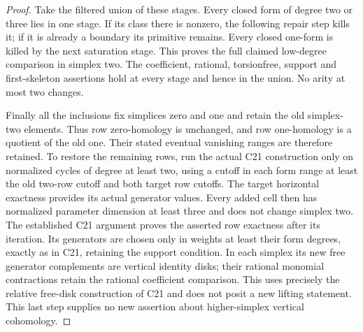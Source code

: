 \begin{proof}
Take the filtered union of these stages.
Every closed form of degree two or three lies
in one stage. If its class there is nonzero,
the following repair step kills it; if it is
already a boundary its primitive remains.
Every closed one-form is killed by the next
saturation stage. This proves the full claimed
low-degree comparison in simplex two.
The coefficient, rational, torsionfree, support
and first-skeleton assertions hold at every
stage and hence in the union.
No arity at most two changes.

Finally all the inclusions fix simplices zero
and one and retain the old simplex-two elements.
Thus row zero-homology is unchanged, and row
one-homology is a quotient of the old one.
Their stated eventual vanishing ranges are
therefore retained. To restore the remaining
rows, run the actual C21 construction only on
normalized cycles of degree at least two,
using a cutoff in each form range at least
the old two-row cutoff and both target row
cutoffs. The target horizontal exactness
provides its actual generator values.
Every added cell then has normalized parameter
dimension at least three and does not change
simplex two. The established C21 argument proves
the asserted row exactness after its iteration.
Its generators are chosen only in weights at least
their form degrees, exactly as in C21, retaining
the support condition.
In each simplex its new free generator complements
are vertical identity disks; their rational monomial
contractions retain the rational coefficient comparison.
This uses precisely the relative free-disk construction
of C21 and does not posit a new lifting statement.
This last step supplies no new assertion about
higher-simplex vertical cohomology.
\end{proof}
